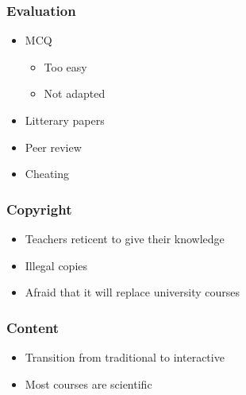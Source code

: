 \begin{frame}
\frametitle{Evaluation}
  \begin{itemize}[<+->]
    \item MCQ
      \begin{itemize}[<+->]
        \item Too easy
        \item Not adapted
      \end{itemize}
    \item Litterary papers
    \item Peer review
    \item Cheating
  \end{itemize}
\end{frame}

\begin{frame}
\frametitle{Copyright}
  \begin{itemize}[<+->]
    \item Teachers reticent to give their knowledge
    \item Illegal copies
    \item Afraid that it will replace university courses
  \end{itemize}
\end{frame}

\begin{frame}
\frametitle{Content}
  \begin{itemize}[<+->]
    \item Transition from traditional to interactive
    \item Most courses are scientific
  \end{itemize}
\end{frame}
